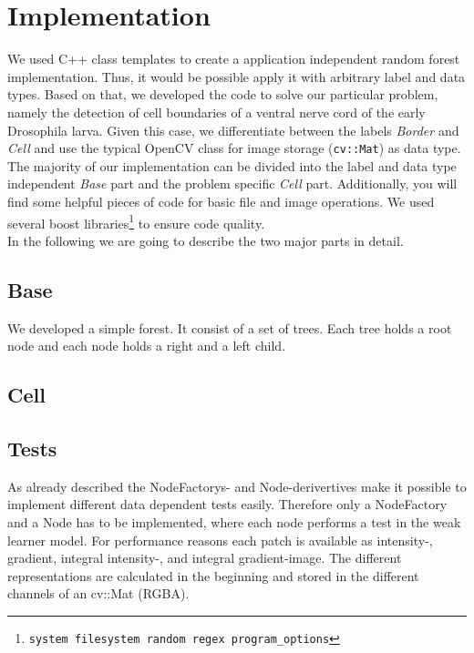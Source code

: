 \section{Implementation}
\label{sec:implementation}


We used C++ class templates to create a application independent random forest implementation. Thus, it would be possible apply it with arbitrary label and data types. Based on that, we developed the code to solve our particular problem, namely the detection of cell boundaries of a ventral nerve cord of the early Drosophila larva. Given this case, we differentiate between the labels \emph{Border} and \emph{Cell} and use the typical OpenCV class for image storage (\texttt{cv::Mat}) as data type.\\
The majority of our implementation can be divided into the label and data type independent \emph{Base} part and the problem specific \emph{Cell} part. Additionally, you will find some helpful pieces of code for basic file and image operations. We used several boost libraries\footnote{\texttt{system filesystem random regex program\_options}} to ensure code quality.\\
In the following we are going to describe the two major parts in detail.

\subsection{Base}
\label{subsec:base}
We developed a simple forest. It consist of a set of trees. Each tree holds a root node and each node holds a right and a left child. 


\subsection{Cell}
\label{subsec:base}


\subsection{Tests}
As already described the NodeFactorys- and Node-derivertives make it possible to implement different data dependent tests easily. Therefore only a NodeFactory and a Node has to be implemented, where each node performs a test in the weak learner model.
For performance reasons each patch is available as intensity-, gradient, integral intensity-, and integral gradient-image. The different representations are calculated in the beginning and stored in the different channels of an cv::Mat (RGBA).

